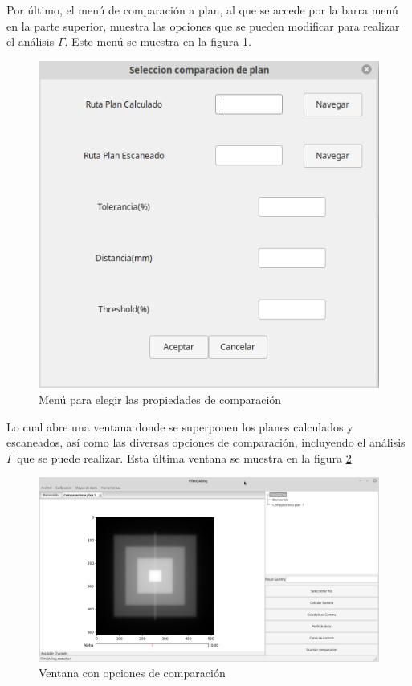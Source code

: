 Por último, el menú de comparación a plan, al que se accede por la barra menú en la parte superior, muestra las opciones que se pueden modificar para realizar el análisis $\Gamma$. Este menú se muestra en la figura \ref{fig:menuComparacion}.

\begin{figure}[H]
	\centering
	\includegraphics[width=0.7\linewidth]{images/imagenesDocumentacion/menuComparacionAplan.png}
	\caption{Menú para elegir las propiedades de comparación }
	\label{fig:menuComparacion}
\end{figure}

Lo cual abre una ventana donde se superponen los planes calculados y escaneados, así como las diversas opciones de comparación, incluyendo el análisis $\Gamma$ que se puede realizar. Esta última ventana se muestra en la figura \ref{fig:ventanaComparacion}

\begin{figure}[H]
	\centering
	\includegraphics[width=0.7\linewidth]{images/imagenesDocumentacion/ventanaComparacioAPlan.png}
	\caption{Ventana con opciones de comparación }
	\label{fig:ventanaComparacion}
\end{figure}

